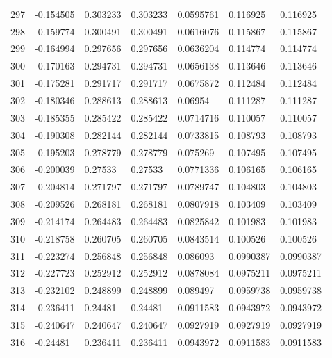 \begin{longtable}{l|lll|lll}
 297 & -0.154505    & 0.303233    & 0.303233    &  0.0595761   & 0.116925    & 0.116925    \\
 298 & -0.159774    & 0.300491    & 0.300491    &  0.0616076   & 0.115867    & 0.115867    \\
 299 & -0.164994    & 0.297656    & 0.297656    &  0.0636204   & 0.114774    & 0.114774    \\
 300 & -0.170163    & 0.294731    & 0.294731    &  0.0656138   & 0.113646    & 0.113646    \\
 301 & -0.175281    & 0.291717    & 0.291717    &  0.0675872   & 0.112484    & 0.112484    \\
 302 & -0.180346    & 0.288613    & 0.288613    &  0.06954     & 0.111287    & 0.111287    \\
 303 & -0.185355    & 0.285422    & 0.285422    &  0.0714716   & 0.110057    & 0.110057    \\
 304 & -0.190308    & 0.282144    & 0.282144    &  0.0733815   & 0.108793    & 0.108793    \\
 305 & -0.195203    & 0.278779    & 0.278779    &  0.075269    & 0.107495    & 0.107495    \\
 306 & -0.200039    & 0.27533     & 0.27533     &  0.0771336   & 0.106165    & 0.106165    \\
 307 & -0.204814    & 0.271797    & 0.271797    &  0.0789747   & 0.104803    & 0.104803    \\
 308 & -0.209526    & 0.268181    & 0.268181    &  0.0807918   & 0.103409    & 0.103409    \\
 309 & -0.214174    & 0.264483    & 0.264483    &  0.0825842   & 0.101983    & 0.101983    \\
 310 & -0.218758    & 0.260705    & 0.260705    &  0.0843514   & 0.100526    & 0.100526    \\
 311 & -0.223274    & 0.256848    & 0.256848    &  0.086093    & 0.0990387   & 0.0990387   \\
 312 & -0.227723    & 0.252912    & 0.252912    &  0.0878084   & 0.0975211   & 0.0975211   \\
 313 & -0.232102    & 0.248899    & 0.248899    &  0.089497    & 0.0959738   & 0.0959738   \\
 314 & -0.236411    & 0.24481     & 0.24481     &  0.0911583   & 0.0943972   & 0.0943972   \\
 315 & -0.240647    & 0.240647    & 0.240647    &  0.0927919   & 0.0927919   & 0.0927919   \\
 316 & -0.24481     & 0.236411    & 0.236411    &  0.0943972   & 0.0911583   & 0.0911583   \\

\end{longtable}
